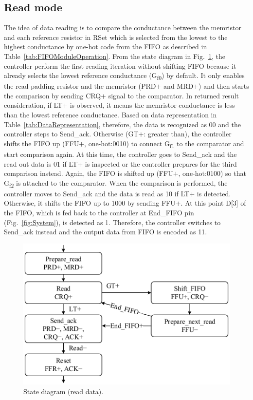 \documentclass[twocolumn,conference]{IEEEtran}
\begin{document}
\subsection{Read mode}
\label{subsec:ReadMode}
The idea of data reading is to compare the conductance between the memristor and each reference resistor in RSet which is selected from the lowest to the highest conductance by one-hot code from the FIFO as described in Table~\ref{tab:FIFOModuleOperation}. 
From the state diagram in Fig.~\ref{fig:StateDiagramRead}, the controller perform the first reading iteration without shifting FIFO because it already selects the lowest reference conductance (G\textsubscript{f0}) by default. It only enables the read padding resistor and the memristor (PRD$+$ and MRD$+$) and then starts the comparison by sending CRQ$+$ signal to the comparator. In returned result consideration, if LT$+$ is observed, it means the memristor conductance is less than the lowest reference conductance. Based on data representation in Table~\ref{tab:DataRepresentation}, therefore, the data is recognized as 00 and the controller steps to Send\_ack. Otherwise (GT$+$: greater than), the controller shifts the FIFO up (FFU$+$, one-hot:0010) to connect G\textsubscript{f1} to the comparator and start comparison again. At this time, the controller goes to Send\_ack and the read out data is 01 if LT$+$ is inspected or the controller prepares for the third comparison instead. Again, the FIFO is shifted up (FFU$+$, one-hot:0100) so that G\textsubscript{f2} is attached to the comparator. When the comparison is performed, the controller moves to Send\_ack and the data is read as 10 if LT$+$ is detected. Otherwise, it shifts the FIFO up to 1000 by sending FFU$+$. At this point D[3] of the FIFO, which is fed back to the controller at End\_FIFO pin (Fig.~\ref{fig:System}), is detected as 1. Therefore, the controller switches to Send\_ack instead and the output data from FIFO is encoded as 11.
\begin{figure}[t]
    \centering
    \includegraphics[scale=0.5]{figs/StateDiagramReadV5}
    \caption{State diagram (read data).}
    \label{fig:StateDiagramRead}
\end{figure}
\end{document}

